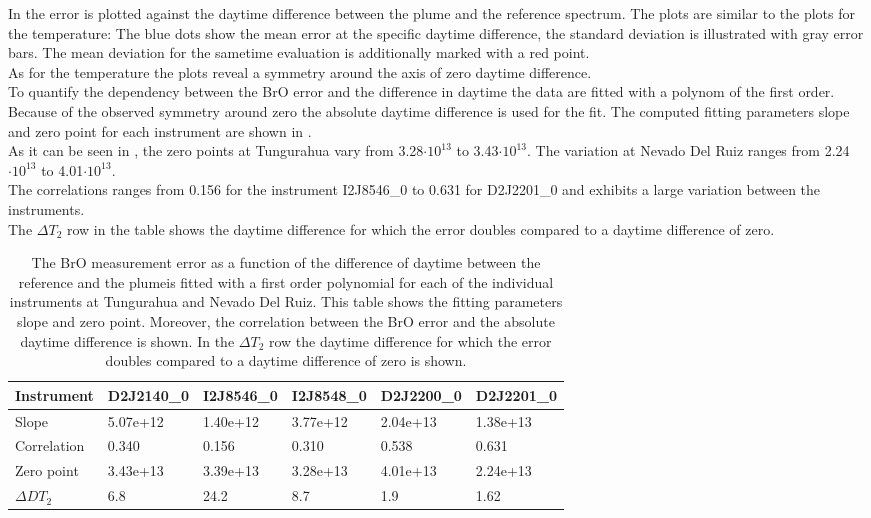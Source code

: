 In  the  error is plotted against the daytime difference between the plume and the reference spectrum. The plots are similar to the plots for the temperature: The blue dots show the mean  error at the specific daytime difference, the standard deviation is illustrated with gray error bars. The mean  deviation for the sametime evaluation is additionally marked with a red point. \\
As for the temperature the plots reveal a symmetry around the axis of zero daytime difference.\\
%
To quantify the dependency between the BrO error and the difference in daytime the data are fitted with a polynom of the first order. Because of the observed symmetry around zero the absolute daytime difference is used for the fit. The computed fitting parameters slope and zero point for each instrument are shown in . \\
%
As it can be seen in , the zero points at Tungurahua vary from 3.28$\cdot10^{13}$ to 3.43$\cdot10^{13}$. The variation at Nevado Del Ruiz ranges from  2.24$\cdot10^{13}$ to 4.01$\cdot10^{13}$. \\
The correlations ranges from 0.156 for the instrument I2J8546\_0 to  0.631 for D2J2201\_0 and exhibits a large variation between the instruments.\\
The $\Delta T_{2}$ row in the table shows the daytime difference for which the error doubles compared to a daytime difference of zero.
	\begin{table}[h]
	\begin{tabular}{|p{2cm}|p{2cm}|p{2cm}|p{2cm}|p{2cm}|p{2cm}|}
		Instrument	&D2J2140\_0&I2J8546\_0& I2J8548\_0&D2J2200\_0&D2J2201\_0\\
		\toprule
		Slope&5.07e+12&1.40e+12 &3.77e+12 &2.04e+13& 1.38e+13\\
		\midrule
		Correlation&
		0.340&
		0.156&
		0.310&
		0.538&
		0.631\\
		\midrule
		Zero point& 3.43e+13&3.39e+13&3.28e+13&  4.01e+13&  2.24e+13\\
		\midrule
		$\Delta DT_{2}$&6.8&24.2&8.7&1.9&1.62\\
		\bottomrule
	\end{tabular}
	\label{tab:dtcalc}
	\caption{The BrO measurement error as a function of the difference of daytime between the reference and the plumeis fitted with a first order polynomial for each of the individual instruments at Tungurahua and Nevado Del Ruiz. This table shows the fitting parameters slope and zero point. Moreover, the correlation between the BrO error and the absolute daytime difference is shown. In the $\Delta T_{2}$ row the daytime difference for which the error doubles compared to a daytime difference of zero is shown.}
\end{table}

